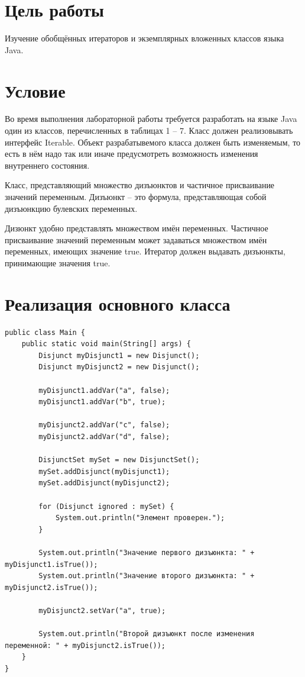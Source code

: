 \documentclass[a4paper, 14pt]{extarticle}
\begin{document}
\newpage
\section{Цель работы}
Изучение обобщённых итераторов и экземплярных вложенных классов языка Java.

\section{Условие}
Во время выполнения лабораторной работы требуется разработать на языке Java один
из классов, перечисленных в таблицах 1 – 7. Класс должен реализовывать интерфейс Iterable.
Объект разрабатывемого класса должен быть изменяемым, то есть в нём надо так или
иначе предусмотреть возможность изменения внутреннего состояния.

Класс, представляющий множество дизъюнктов и частичное присваивание значений
переменным. Дизъюнкт – это формула, представляющая собой дизъюнкцию
булевских переменных.

Дизюнкт удобно представлять множеством имён переменных. Частичное
присваивание значений переменным может задаваться множеством имён
переменных, имеющих значение true. Итератор должен выдавать дизъюнкты,
принимающие значения true.

\section{Реализация основного класса}
{\scriptsize
\begin{verbatim}
public class Main {
    public static void main(String[] args) {
        Disjunct myDisjunct1 = new Disjunct();
        Disjunct myDisjunct2 = new Disjunct();

        myDisjunct1.addVar("a", false);
        myDisjunct1.addVar("b", true);

        myDisjunct2.addVar("c", false);
        myDisjunct2.addVar("d", false);

        DisjunctSet mySet = new DisjunctSet();
        mySet.addDisjunct(myDisjunct1);
        mySet.addDisjunct(myDisjunct2);

        for (Disjunct ignored : mySet) {
            System.out.println("Элемент проверен.");
        }

        System.out.println("Значение первого дизъюнкта: " + myDisjunct1.isTrue());
        System.out.println("Значение второго дизъюнкта: " + myDisjunct2.isTrue());

        myDisjunct2.setVar("a", true);

        System.out.println("Второй дизъюнкт после изменения переменной: " + myDisjunct2.isTrue());
    }
}
\end{verbatim}
}
\end{document}
